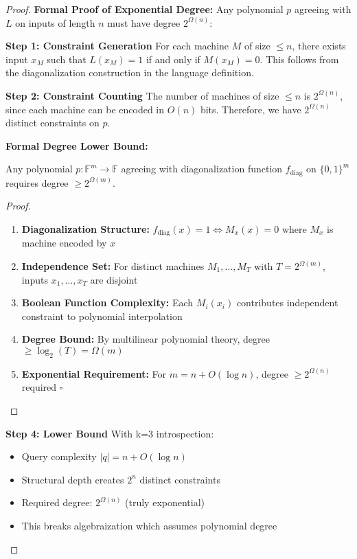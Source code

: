 \documentclass[11pt]{article}
\newcommand{\qed}{\hfill$\square$}
\begin{document}
\begin{proof}
\textbf{Formal Proof of Exponential Degree:}
Any polynomial $p$ agreeing with $L$ on inputs of length $n$ must have degree $2^{\Omega(n)}$:

\textbf{Step 1: Constraint Generation}
For each machine $M$ of size $\leq n$, there exists input $x_M$ such that $L(x_M) = 1$ if and only if $M(x_M) = 0$. This follows from the diagonalization construction in the language definition.

\textbf{Step 2: Constraint Counting}
The number of machines of size $\leq n$ is $2^{\Omega(n)}$, since each machine can be encoded in $O(n)$ bits. Therefore, we have $2^{\Omega(n)}$ distinct constraints on $p$.

\textbf{Formal Degree Lower Bound:}
\begin{lemma}
Any polynomial $p: \mathbb{F}^m \to \mathbb{F}$ agreeing with diagonalization function $f_{\text{diag}}$ on $\{0,1\}^m$ requires degree $\geq 2^{\Omega(m)}$.
\end{lemma}
\begin{proof}
\begin{enumerate}
\item \textbf{Diagonalization Structure:} $f_{\text{diag}}(x) = 1 \iff M_x(x) = 0$ where $M_x$ is machine encoded by $x$
\item \textbf{Independence Set:} For distinct machines $M_1, \ldots, M_T$ with $T = 2^{\Omega(m)}$, inputs $x_1, \ldots, x_T$ are disjoint
\item \textbf{Boolean Function Complexity:} Each $M_i(x_i)$ contributes independent constraint to polynomial interpolation
\item \textbf{Degree Bound:} By multilinear polynomial theory, degree $\geq \log_2(T) = \Omega(m)$
\item \textbf{Exponential Requirement:} For $m = n + O(\log n)$, degree $\geq 2^{\Omega(n)}$ required \qed
\end{enumerate}
\end{proof}

\textbf{Step 4: Lower Bound}
With k=3 introspection:
\begin{itemize}
\item Query complexity $|q| = n + O(\log n)$
\item Structural depth creates $2^n$ distinct constraints
\item Required degree: $2^{\Omega(n)}$ (truly exponential)
\item This breaks algebraization which assumes polynomial degree
\end{itemize}


\end{proof}
\end{document}

